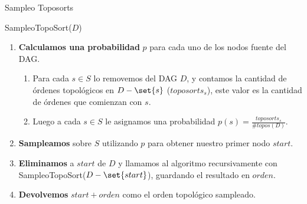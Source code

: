\begin{frame}[noframenumbering]{Sampleo Toposorts}
	\begin{algorithm}[H]
		\caption{SampleoTopoSort($D$)} \label{alg:topoSortSampling}
		\begin{enumerate}
			\item \textbf{Calculamos una probabilidad} $p$ para cada uno de los nodos fuente del DAG.
			\begin{enumerate}
				\item Para cada $s \in S$ lo removemos del DAG $D$, y contamos la cantidad de órdenes topológicos en $D-\set{s}$ ($toposorts_s$), este valor es la cantidad de órdenes que comienzan con $s$.
				\item Luego a cada $s \in S$ le asignamos una probabilidad $p(s)= \frac{toposorts_s}{\#topos(D)}$. 
			\end{enumerate}
			\item \textbf{Sampleamos} sobre $S$ utilizando $p$ para obtener nuestro primer nodo $start$.
			\item \textbf{Eliminamos} a $start$ de $D$ y llamamos al algoritmo recursivamente con  SampleoTopoSort($D-\set{start}$), guardando el resultado en $orden$. 
			\item \textbf{Devolvemos} $start + orden$ como el orden topológico sampleado. 
		\end{enumerate}
	\end{algorithm}
\end{frame}